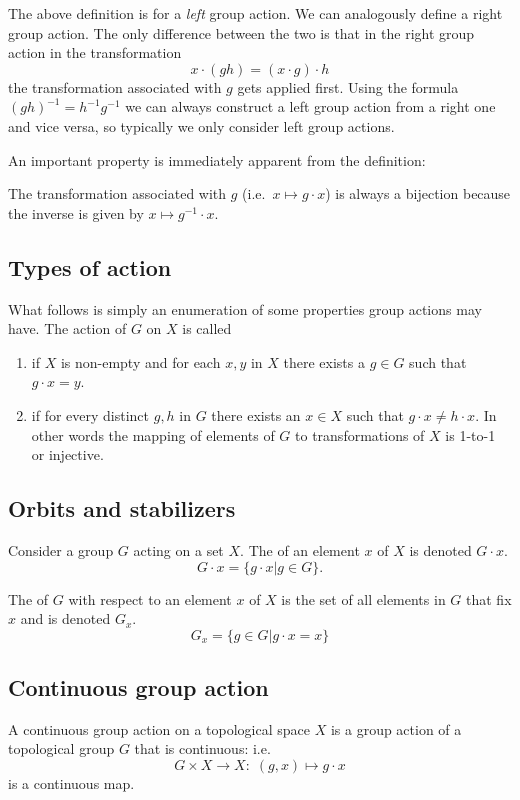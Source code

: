 The above definition is for a \textit{left} group action. We can analogously define a right group action. The only difference between the two is that in the right group action in the transformation
\[ x \cdot (gh) = (x\cdot g)\cdot h \]
the transformation associated with $g$ gets applied first. Using the formula $(gh)^{-1} = h^{-1}g^{-1}$ we can always construct a left group action from a right one and vice versa, so typically we only consider left group actions.

An important property is immediately apparent from the definition:
\begin{eigenschap}
The transformation associated with $g$ (i.e.\ $x\mapsto g\cdot x$) is always a bijection because the inverse is given by $x \mapsto g^{-1}\cdot x$.
\end{eigenschap}

\subsection{Types of action}
What follows is simply an enumeration of some properties group actions may have. The action of $G$ on $X$ is called
\begin{enumerate}
\item {} if $X$ is non-empty and for each $x,y$ in $X$ there exists a $g \in G$ such that $g\cdot x = y$.
\item {} if for every distinct $g,h$ in $G$ there exists an $x \in X$ such that $g\cdot x \neq h\cdot x$. In other words the mapping of elements of $G$ to transformations of $X$ is 1-to-1 or injective.
\end{enumerate}

\subsection{Orbits and stabilizers}
\begin{definition}
Consider a group $G$ acting on a set $X$. The  of an element $x$ of $X$ is denoted $G\cdot x$.
\[ G\cdot x = \{ g\cdot x | g\in G \}. \]
\end{definition}

The  of $G$ with respect to an element $x$ of $X$ is the set of all elements in $G$ that fix $x$ and is denoted $G_x$.
\[G_x = \{ g\in G | g\cdot x = x \} \]

\subsection{Continuous group action}
A continuous group action on a topological space $X$ is a group action of a topological group $G$ that is continuous: i.e.\,
\[G \times X \to X : \;(g, x) \mapsto g \cdot x \]
is a continuous map.

